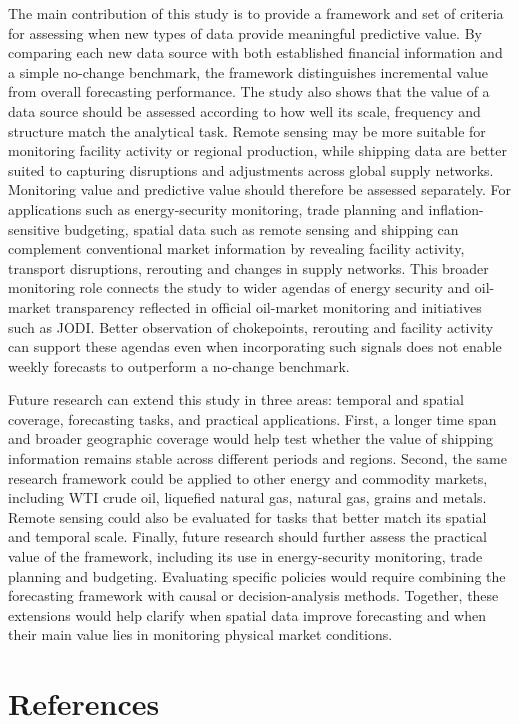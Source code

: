 \documentclass[
  british,
  12pt,
  oneside]{book}
\begin{document}
The main contribution of this study is to provide a framework and set of criteria for assessing when new types of data provide meaningful predictive value. By comparing each new data source with both established financial information and a simple no-change benchmark, the framework distinguishes incremental value from overall forecasting performance. The study also shows that the value of a data source should be assessed according to how well its scale, frequency and structure match the analytical task. Remote sensing may be more suitable for monitoring facility activity or regional production, while shipping data are better suited to capturing disruptions and adjustments across global supply networks. Monitoring value and predictive value should therefore be assessed separately. For applications such as energy-security monitoring, trade planning and inflation-sensitive budgeting, spatial data such as remote sensing and shipping can complement conventional market information by revealing facility activity, transport disruptions, rerouting and changes in supply networks. This broader monitoring role connects the study to wider agendas of energy security and oil-market transparency reflected in official oil-market monitoring and initiatives such as JODI. Better observation of chokepoints, rerouting and facility activity can support these agendas even when incorporating such signals does not enable weekly forecasts to outperform a no-change benchmark.

Future research can extend this study in three areas: temporal and spatial coverage, forecasting tasks, and practical applications. First, a longer time span and broader geographic coverage would help test whether the value of shipping information remains stable across different periods and regions. Second, the same research framework could be applied to other energy and commodity markets, including WTI crude oil, liquefied natural gas, natural gas, grains and metals. Remote sensing could also be evaluated for tasks that better match its spatial and temporal scale. Finally, future research should further assess the practical value of the framework, including its use in energy-security monitoring, trade planning and budgeting. Evaluating specific policies would require combining the forecasting framework with causal or decision-analysis methods. Together, these extensions would help clarify when spatial data improve forecasting and when their main value lies in monitoring physical market conditions.

\chapter*{References}\label{references}
\end{document}
